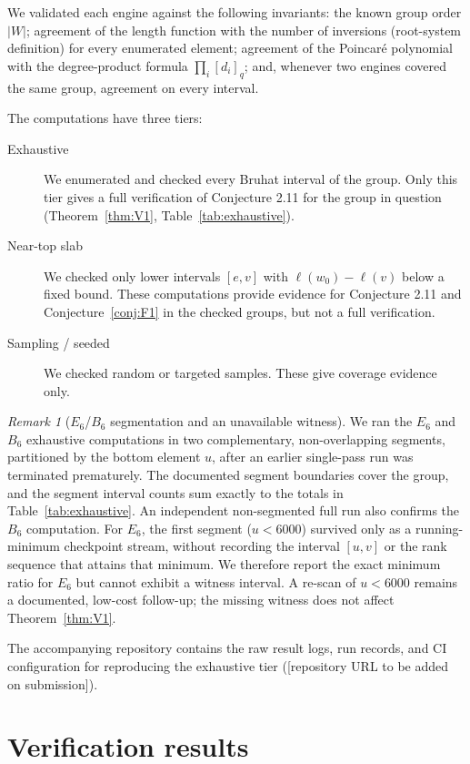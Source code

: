 \documentclass[11pt]{amsart}
\theoremstyle{plain}
\theoremstyle{definition}
\theoremstyle{remark}
\newtheorem{remark}[theorem]{Remark}
\newcommand{\W}{W}
\begin{document}
We validated each engine against the following invariants: the known group
order $|\W|$; agreement of the length function with the number of inversions (root-system definition) for every enumerated element; agreement of the Poincar\'e polynomial with the degree-product formula $\prod_i[d_i]_q$; and, whenever two engines covered
the same group, agreement on every interval.

The computations have three tiers:

\begin{description}
\item[Exhaustive] We enumerated and checked every Bruhat interval of the
group. Only this tier gives a full verification of Conjecture 2.11 for the
group in question (Theorem~\ref{thm:V1},
Table~\ref{tab:exhaustive}).
\item[Near-top slab] We checked only lower intervals $[e,v]$ with
$\ell(w_0)-\ell(v)$ below a fixed bound. These computations provide
evidence for Conjecture 2.11 and Conjecture~\ref{conj:F1} in the checked
groups, but not a full verification.
\item[Sampling / seeded] We checked random or targeted samples. These give
coverage evidence only.
\end{description}

\begin{remark}[$E_6$/$B_6$ segmentation and an unavailable witness]
\label{rem:e6segment}
We ran the $E_6$ and $B_6$ exhaustive computations in two complementary,
non-overlapping segments, partitioned by the bottom element $u$, after an earlier single-pass run was terminated prematurely. The documented segment boundaries
cover the group, and the segment interval counts sum exactly to the totals
in Table~\ref{tab:exhaustive}. An independent non-segmented full run also
confirms the $B_6$ computation. For $E_6$, the first segment ($u<6000$)
survived only as a running-minimum checkpoint stream, without recording the interval $[u,v]$ or the rank sequence that attains that minimum. We therefore report the
exact minimum ratio for $E_6$ but cannot exhibit a witness interval. A
re-scan of $u<6000$ remains a documented, low-cost follow-up; the missing
witness does not affect Theorem~\ref{thm:V1}.
\end{remark}

The accompanying repository contains the raw result logs, run records, and
CI configuration for reproducing the exhaustive tier
([repository URL to be added on submission]).

\section{Verification results}
\label{sec:results}
\end{document}

